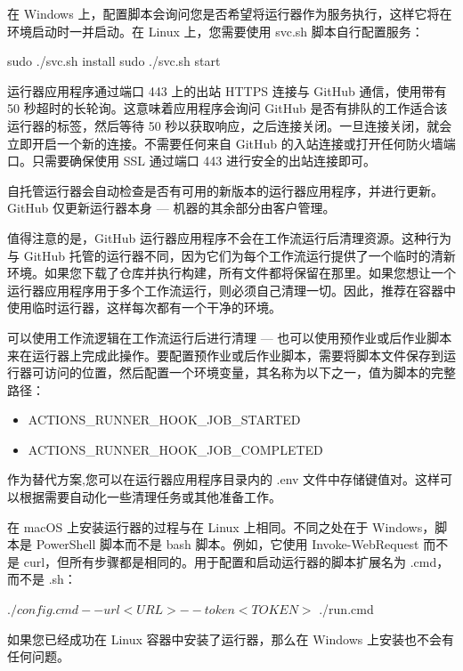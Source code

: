 在 Windows 上，配置脚本会询问您是否希望将运行器作为服务执行，这样它将在环境启动时一并启动。在 Linux 上，您需要使用 svc.sh 脚本自行配置服务：

\begin{shell}
sudo ./svc.sh install
sudo ./svc.sh start
\end{shell}


运行器应用程序通过端口 443 上的出站 HTTPS 连接与 GitHub 通信，使用带有 50 秒超时的长轮询。这意味着应用程序会询问 GitHub 是否有排队的工作适合该运行器的标签，然后等待 50 秒以获取响应，之后连接关闭。一旦连接关闭，就会立即开启一个新的连接。不需要任何来自 GitHub 的入站连接或打开任何防火墙端口。只需要确保使用 SSL 通过端口 443 进行安全的出站连接即可。


自托管运行器会自动检查是否有可用的新版本的运行器应用程序，并进行更新。GitHub 仅更新运行器本身 --- 机器的其余部分由客户管理。


值得注意的是，GitHub 运行器应用程序不会在工作流运行后清理资源。这种行为与 GitHub 托管的运行器不同，因为它们为每个工作流运行提供了一个临时的清新环境。如果您下载了仓库并执行构建，所有文件都将保留在那里。如果您想让一个运行器应用程序用于多个工作流运行，则必须自己清理一切。因此，推荐在容器中使用临时运行器，这样每次都有一个干净的环境。

可以使用工作流逻辑在工作流运行后进行清理 --- 也可以使用预作业或后作业脚本来在运行器上完成此操作。要配置预作业或后作业脚本，需要将脚本文件保存到运行器可访问的位置，然后配置一个环境变量，其名称为以下之一，值为脚本的完整路径：

\begin{itemize}
\item 
ACTIONS\_RUNNER\_HOOK\_JOB\_STARTED

\item 
ACTIONS\_RUNNER\_HOOK\_JOB\_COMPLETED
\end{itemize}

作为替代方案,您可以在运行器应用程序目录内的 .env 文件中存储键值对。这样可以根据需要自动化一些清理任务或其他准备工作。


在 macOS 上安装运行器的过程与在 Linux 上相同。不同之处在于 Windows，脚本是 PowerShell 脚本而不是 bash 脚本。例如，它使用 Invoke-WebRequest 而不是 curl，但所有步骤都是相同的。用于配置和启动运行器的脚本扩展名为 .cmd，而不是 .sh：

\begin{shell}
$ ./config.cmd --url <URL> --token <TOKEN>
$ ./run.cmd
\end{shell}

如果您已经成功在 Linux 容器中安装了运行器，那么在 Windows 上安装也不会有任何问题。


